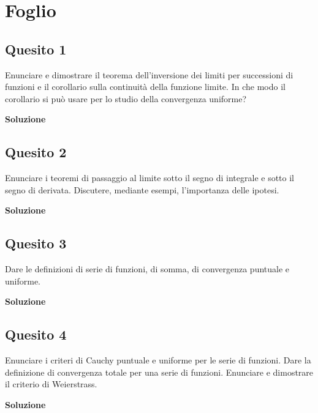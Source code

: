 \chapter{Foglio \ \thechapter}


\section*{Quesito 1}
Enunciare e dimostrare il teorema dell’inversione dei limiti per successioni di
funzioni e il corollario sulla continuità della funzione limite. In che modo il corollario si
può usare per lo studio della convergenza uniforme?

\medskip
\begin{large}
\textbf{Soluzione}
\end{large}


\section*{Quesito 2}
Enunciare i teoremi di passaggio al limite sotto il segno di integrale e sotto il
segno di derivata. Discutere, mediante esempi, l’importanza delle ipotesi.


\medskip
\begin{large}
\textbf{Soluzione}
\end{large}


\section*{Quesito 3}
Dare le definizioni di serie di funzioni, di somma, di convergenza puntuale e
uniforme.


\medskip
\begin{large}
\textbf{Soluzione}
\end{large}


\section*{Quesito 4}
Enunciare i criteri di Cauchy puntuale e uniforme per le serie di funzioni. Dare
la definizione di convergenza totale per una serie di funzioni. Enunciare e dimostrare il
criterio di Weierstrass.

\medskip
\begin{large}
\textbf{Soluzione}
\end{large}



